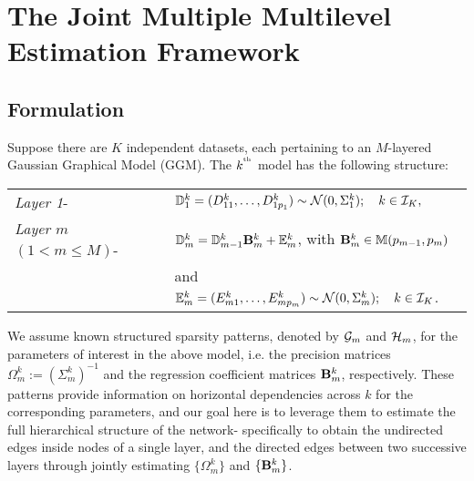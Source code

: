 \section{The Joint Multiple Multilevel Estimation Framework}
\subsection{Formulation}
Suppose there are $K$ independent datasets, each pertaining to an $M$-layered Gaussian Graphical Model (GGM). The $k^{\operatorname*{^{\text{th}}}}$ model has the following structure:

\vspace{1em}
\begin{tabular}{ll}
{\it Layer 1}- &
%
${\mathbb{D}}_1^k = (D_{1 1}^k, \ldots, D^k_{1 p_1}) \sim
{\cal{N}} (0, \Sigma_1^k); \quad k \in {\cal{I}}_K,$\\
{\it Layer $m$} $(1< m \leq M)$-  &
%
$ {\mathbb{D}}_m^k = {\mathbb{D}}_{m-1}^k {\mathbf{B}}_m^k + {\mathbb{E}}_m^k$, with ${\mathbf{B}}_m^k \in {\mathbb{M}}(p_{m-1}, p_m) $\\
& and ${\mathbb{E}}_m^k = (E_{m 1}^k, \ldots, E^k_{m p_m}) \sim
{\cal{N}} (0, \Sigma_m^k); \quad k \in {\cal{I}}_K $.\\
\end{tabular}
\vspace{1em}

We assume known structured sparsity patterns, denoted by ${\cal{G}}_m$ and ${\cal{H}}_m$, for the parameters of interest in the above model, i.e. the precision matrices $\Omega_m^k := (\Sigma_m^k)^{-1}$ and the regression coefficient matrices ${\mathbf{B}}_m^k$, respectively. These patterns provide information on horizontal dependencies across $k$ for the corresponding parameters, and our goal here is to leverage them to estimate the full hierarchical structure of the network- specifically to obtain the undirected edges inside nodes of a single layer, and the directed edges between two successive layers through jointly estimating $\{ \Omega_m^k \}$ and $\{ {\mathbf{B}}_m^k \}$.

